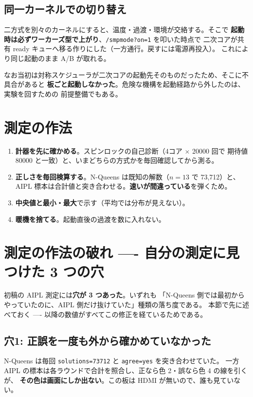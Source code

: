 \documentclass[a4paper,11pt]{ltjsarticle}
\begin{document}
\subsection{同一カーネルでの切り替え}
二方式を別々のカーネルにすると、温度・過渡・環境が交絡する。そこで
\textbf{起動時は必ずワーカーズ型で上がり}、\texttt{/smpmode?on=1} を叩いた時点で
二次コアが共有 ready キューへ移る作りにした（一方通行。戻すには電源再投入）。
これにより同じ起動のまま A/B が取れる。

なお当初は対称スケジューラが二次コアの起動先そのものだったため、そこに不具合があると
\textbf{板ごと起動しなかった}。危険な機構を起動経路から外したのは、実験を回すための
前提整備でもある。

\section{測定の作法}

\begin{enumerate}
\item \textbf{計器を先に確かめる}。スピンロックの自己診断（4コア $\times$ 20000 回で
      期待値 80000 と一致）と、いまどちらの方式かを毎回確認してから測る。
\item \textbf{正しさを毎回検算する}。N-Queens は既知の解数（$n=13$ で 73,712）と、
      AIPL 標本は合計値と突き合わせる。\textbf{速いが間違っている}を弾くため。
\item \textbf{中央値と最小・最大}で示す（平均では分布が見えない）。
\item \textbf{暖機を捨てる}。起動直後の過渡を数に入れない。
\end{enumerate}


\section{測定の作法の破れ ---- 自分の測定に見つけた 3 つの穴}\label{sec:flaw}

初稿の AIPL 測定には\textbf{穴が 3 つあった}。いずれも
「N-Queens 側では最初からやっていたのに、AIPL 側だけ抜けていた」種類の落ち度である。
本節で先に述べておく ---- 以降の数値がすべてこの修正を経ているためである。

\subsection{穴1: 正誤を一度も外から確かめていなかった}
N-Queens は毎回 \texttt{solutions=73712} と \texttt{agree=yes} を突き合わせていた。
一方 AIPL の標本は各ラウンドで合計を照合し、正なら色 2・誤なら色 4 の線を引くが、
\textbf{その色は画面にしか出ない}。この板は HDMI が無いので、誰も見ていない。
\end{document}
